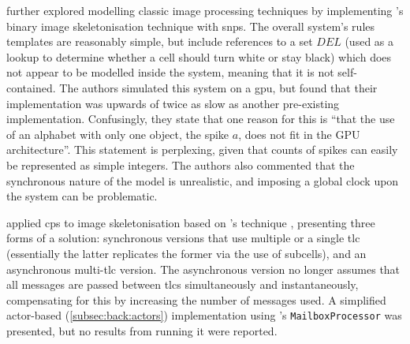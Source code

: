\citeauthor{Diaz-Pernil2013a} \cite{Diaz-Pernil2013a} further explored modelling classic image processing techniques by implementing \citeauthor{Guo1989}'s binary image skeletonisation technique \cite{Guo1989} with \gls{snps}.  The overall system's rules templates are reasonably simple, but include references to a set \(\mathit{DEL}\) (used as a lookup to determine whether a cell should turn white or stay black) which does not appear to be modelled inside the system, meaning that it is not self-contained.  The authors simulated this system on a \gls{gpu}, but found that their implementation was upwards of twice as slow as another pre-existing implementation.  Confusingly, they state that one reason for this is \enquote{that the use of an alphabet with only one object, the spike \(a\), does not fit in the GPU architecture}.  This statement is perplexing, given that counts of spikes can easily be represented as simple integers.  The authors also commented that the synchronous nature of the model is unrealistic, and imposing a global clock upon the system can be problematic.


\citeauthor{Nicolescu2014} \cite{Nicolescu2014} applied \gls{cps} to image skeletonisation based on \citeauthor{Guo1989}'s technique \cite{Guo1989}, presenting three forms of a solution: synchronous versions that use multiple or a single \gls{tlc} (essentially the latter replicates the former via the use of subcells), and an asynchronous multi-\gls{tlc} version.  The asynchronous version no longer assumes that all messages are passed between \glspl{tlc} simultaneously and instantaneously, compensating for this by increasing the number of messages used.  A simplified \gls{actor}-based (\vref{subsec:back:actors}) implementation using \fsharp{}'s \texttt{MailboxProcessor} \cite[ch.~11]{Syme2015a} was presented, but no results from running it were reported.

